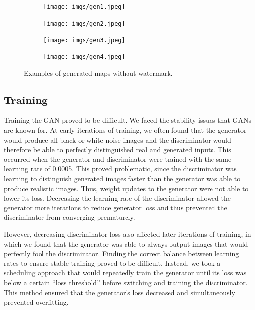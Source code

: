 \documentclass[11pt,twocolumn,letterpaper]{article}
\begin{document}
  \begin{figure}[ht]
    \centering
    \begin{subfigure}[b]{0.24\linewidth}
        \texttt{[image: imgs/gen1.jpeg]}
    \end{subfigure}
    \begin{subfigure}[b]{0.24\linewidth}
        \texttt{[image: imgs/gen2.jpeg]}
    \end{subfigure}
    \begin{subfigure}[b]{0.24\linewidth}
        \texttt{[image: imgs/gen3.jpeg]}
    \end{subfigure}
    \begin{subfigure}[b]{0.24\linewidth}
        \texttt{[image: imgs/gen4.jpeg]}
    \end{subfigure}
        \caption{Examples of generated maps without watermark.}
        \label{fig:generated}
\end{figure}

\subsection{Training}
Training the GAN proved to be difficult. We faced the stability issues that GANs are known for. At early iterations of training, we often found that the generator would produce all-black or white-noise images and the discriminator would therefore be able to perfectly distinguished real and generated inputs. This occurred when the generator and discriminator were trained with the same learning rate of 0.0005. This proved problematic, since the discriminator was learning to distinguish generated images faster than the generator was able to produce realistic images. Thus, weight updates to the generator were not able to lower its loss. Decreasing the learning rate of the discriminator allowed the generator more iterations to reduce generator loss and thus prevented the discriminator from converging prematurely.

However, decreasing discriminator loss also affected later iterations of training, in which we found that the generator was able to always output images that would perfectly fool the discriminator. Finding the correct balance between learning rates to ensure stable training proved to be difficult. Instead, we took a scheduling approach that would repeatedly train the generator until its loss was below a certain ``loss threshold'' before switching and training the discriminator. This method ensured that the generator's loss decreased and simultaneously prevented overfitting.
\end{document}
